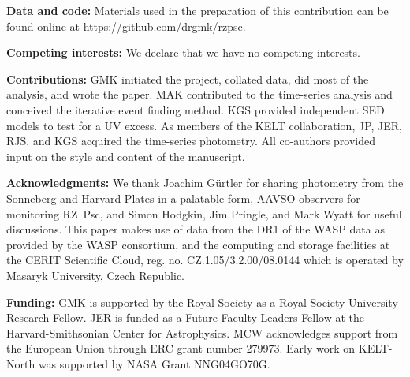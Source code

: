 \documentclass[]{rsos}
\begin{document}
\ack{}

\textbf{Data and code:} Materials used in the preparation of this contribution can be
found online at \href{https://github.com/drgmk/rzpsc}{https://github.com/drgmk/rzpsc}.

\textbf{Competing interests:} We declare that we have no competing interests.

\textbf{Contributions:} GMK initiated the project, collated data, did most of the
analysis, and wrote the paper. MAK contributed to the time-series analysis and conceived
the iterative event finding method. KGS provided independent SED models to test for a UV
excess. As members of the KELT collaboration, JP, JER, RJS, and KGS acquired the
time-series photometry. All co-authors provided input on the style and content of the
manuscript.

\textbf{Acknowledgments:} We thank Joachim G\"urtler for sharing photometry from the
Sonneberg and Harvard Plates in a palatable form, AAVSO observers for monitoring RZ~Psc,
and Simon Hodgkin, Jim Pringle, and Mark Wyatt for useful discussions. This paper makes
use of data from the DR1 of the WASP data \cite{2010A&A...520L..10B} as provided by the
WASP consortium, and the computing and storage facilities at the CERIT Scientific Cloud,
reg. no. CZ.1.05/3.2.00/08.0144 which is operated by Masaryk University, Czech Republic.

\textbf{Funding:} GMK is supported by the Royal Society as a Royal Society University
Research Fellow. JER is funded as a Future Faculty Leaders Fellow at the
Harvard-Smithsonian Center for Astrophysics. MCW acknowledges support from the European
Union through ERC grant number 279973. Early work on KELT-North was supported by NASA
Grant NNG04GO70G.

 

%
\end{document}
